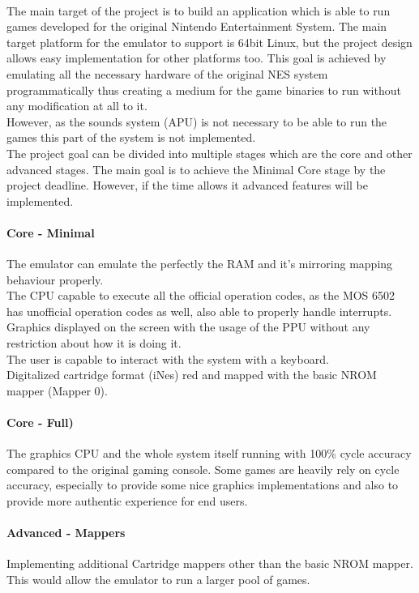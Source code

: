 \documentclass[]{report}
\begin{document}
\paragraph{ }
The main target of the project is to build an application which is able to run games developed for the original Nintendo Entertainment System. The main target platform for the emulator to support is 64bit Linux, but the project design allows easy implementation for other platforms too. This goal is achieved by emulating all the necessary hardware of the original NES system programmatically thus creating a medium for the game binaries to run without any modification at all to it. 
\\ 
However, as the sounds system (APU) is not necessary to be able to run the games this part of the system is not implemented.
\\
The project goal can be divided into multiple stages which are the core and other advanced stages.
The main goal is to achieve the Minimal Core stage by the project deadline. However, if the time allows it advanced features will be implemented. 
\paragraph{Core - Minimal}
The emulator can emulate the perfectly the RAM and it's mirroring mapping behaviour properly. 
\\
The CPU capable to execute all the official operation codes, as the MOS 6502 has unofficial operation codes as well, also able to properly handle interrupts. 
\\ 
Graphics displayed on the screen with the usage of the PPU without any restriction about how it is doing it.
\\ 
The user is capable to interact with the system with a keyboard.
\\ 
Digitalized cartridge format (iNes) red and mapped with the basic NROM mapper (Mapper 0).
\paragraph{Core - Full)}
The graphics CPU and the whole system itself running with 100\% cycle accuracy compared to the original gaming console.
Some games are heavily rely on cycle accuracy, especially to provide some nice graphics implementations and also to provide more authentic experience for end users.

\paragraph{Advanced - Mappers}
Implementing additional Cartridge mappers other than the basic NROM mapper\cite{MPPR}. This would allow the emulator to run a larger pool of games.
\end{document}

